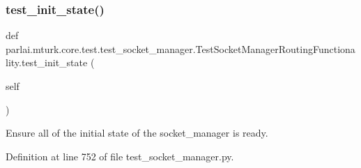 \subsubsection{\texorpdfstring{test\+\_\+init\+\_\+state()}{test\_init\_state()}}
{\footnotesize\ttfamily def parlai.\+mturk.\+core.\+test.\+test\+\_\+socket\+\_\+manager.\+Test\+Socket\+Manager\+Routing\+Functionality.\+test\+\_\+init\+\_\+state (\begin{DoxyParamCaption}\item[{}]{self }\end{DoxyParamCaption})}

\begin{DoxyVerb}Ensure all of the initial state of the socket_manager is ready.
\end{DoxyVerb}
 

Definition at line 752 of file test\+\_\+socket\+\_\+manager.\+py.


